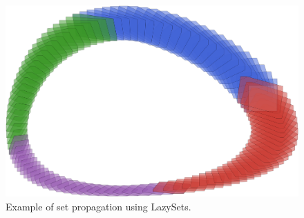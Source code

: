 \begin{figure}[t]
	\centering
	\includegraphics[width=0.7\linewidth, keepaspectratio]{img/lotkavolterra}
	\vspace*{1mm}
	\caption{Example of set propagation using LazySets.}
	\label{fig:lotka_volterra}
\end{figure}

